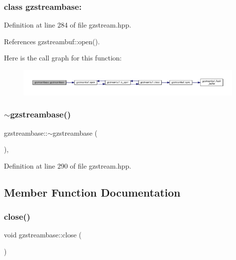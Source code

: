  \subsubsection*{class gzstreambase\+: }



Definition at line 284 of file gzstream.\+hpp.



References gzstreambuf\+::open().

Here is the call graph for this function\+:
\nopagebreak
\begin{figure}[H]
\begin{center}
\leavevmode
\includegraphics[width=350pt]{dc/d09/classgzstreambase_a258adf33ea797692dc3953f514da86de_cgraph}
\end{center}
\end{figure}
\mbox{\label{classgzstreambase_ac2a032f99b3abddb9f60e1a6e9b56405}} 
\subsubsection{\texorpdfstring{$\sim$gzstreambase()}{~gzstreambase()}}
{\footnotesize\ttfamily gzstreambase\+::$\sim$gzstreambase (\begin{DoxyParamCaption}{ }\end{DoxyParamCaption})\hspace{0.3cm}{\ttfamily [inline]}, {\ttfamily [override]}}



Definition at line 290 of file gzstream.\+hpp.



\subsection{Member Function Documentation}
\mbox{\label{classgzstreambase_aec08e42d554bbe919acd44eba0c40057}} 
\subsubsection{\texorpdfstring{close()}{close()}}
{\footnotesize\ttfamily void gzstreambase\+::close (\begin{DoxyParamCaption}{ }\end{DoxyParamCaption})\hspace{0.3cm}{\ttfamily [inline]}}



